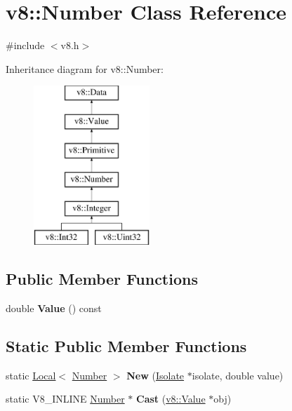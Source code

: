 \hypertarget{classv8_1_1_number}{}\section{v8\+:\+:Number Class Reference}
\label{classv8_1_1_number}


{\ttfamily \#include $<$v8.\+h$>$}

Inheritance diagram for v8\+:\+:Number\+:\begin{figure}[H]
\begin{center}
\leavevmode
\includegraphics[height=6.000000cm]{classv8_1_1_number}
\end{center}
\end{figure}
\subsection*{Public Member Functions}
\begin{DoxyCompactItemize}
\item 
double {\bfseries Value} () const \hypertarget{classv8_1_1_number_ae7ca1af5dd34a7a32a69f57a910ab269}{}\label{classv8_1_1_number_ae7ca1af5dd34a7a32a69f57a910ab269}

\end{DoxyCompactItemize}
\subsection*{Static Public Member Functions}
\begin{DoxyCompactItemize}
\item 
static \hyperlink{classv8_1_1_local}{Local}$<$ \hyperlink{classv8_1_1_number}{Number} $>$ {\bfseries New} (\hyperlink{classv8_1_1_isolate}{Isolate} $\ast$isolate, double value)\hypertarget{classv8_1_1_number_a90ea55018560648ffaf8861372b41928}{}\label{classv8_1_1_number_a90ea55018560648ffaf8861372b41928}

\item 
static V8\+\_\+\+I\+N\+L\+I\+NE \hyperlink{classv8_1_1_number}{Number} $\ast$ {\bfseries Cast} (\hyperlink{classv8_1_1_value}{v8\+::\+Value} $\ast$obj)\hypertarget{classv8_1_1_number_a053d48e0003104308963a4a7e3881912}{}\label{classv8_1_1_number_a053d48e0003104308963a4a7e3881912}

\end{DoxyCompactItemize}
